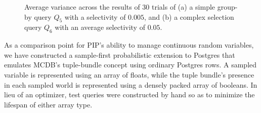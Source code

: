 \begin{figure}
\begin{center}
\caption{Average variance across the results of 30 trials of (a) a simple group-by query $Q_5$ with a selectivity of $0.005$, and (b) a complex selection query $Q_6$ with an average selectivity of $0.05$.}
\label{fig:variance}
\end{center}
\end{figure}

As a comparison point for PIP's ability to manage continuous random variables, we have constructed a sample-first probabilistic extension to Postgres that emulates MCDB's tuple-bundle concept using ordinary Postgres rows.  A sampled variable is represented using an array of floats, while the tuple bundle's presence in each sampled world is represented using a densely packed array of booleans.  In lieu of an optimizer, test queries were constructed by hand so as to minimize the lifespan of either array type.

